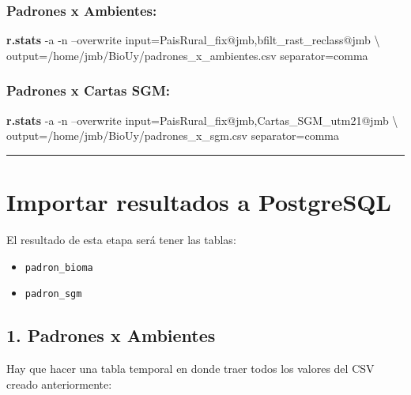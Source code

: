 \documentclass[spanish,]{article}
\newenvironment{Shaded}{}{}
\newcommand{\KeywordTok}[1]{\textcolor[rgb]{0.00,0.44,0.13}{\textbf{{#1}}}}
\newcommand{\NormalTok}[1]{{#1}}
\providecommand{\tightlist}{%
  \setlength{\itemsep}{0pt}\setlength{\parskip}{0pt}}
\begin{document}
\subsubsection{Padrones x Ambientes:}\label{padrones-x-ambientes}

\begin{Shaded}
\begin{Highlighting}[]
\KeywordTok{r.stats} \NormalTok{-a -n --overwrite input=PaisRural_fix@jmb,bfilt_rast_reclass@jmb \textbackslash{}}
  \NormalTok{output=/home/jmb/BioUy/padrones_x_ambientes.csv separator=comma}
\end{Highlighting}
\end{Shaded}

\subsubsection{Padrones x Cartas SGM:}\label{padrones-x-cartas-sgm}

\begin{Shaded}
\begin{Highlighting}[]
\KeywordTok{r.stats} \NormalTok{-a -n --overwrite input=PaisRural_fix@jmb,Cartas_SGM_utm21@jmb \textbackslash{}}
  \NormalTok{output=/home/jmb/BioUy/padrones_x_sgm.csv separator=comma}
\end{Highlighting}
\end{Shaded}

\begin{center}\rule{0.5\linewidth}{\linethickness}\end{center}

\section{Importar resultados a
PostgreSQL}\label{importar-resultados-a-postgresql}

El resultado de esta etapa será tener las tablas:

\begin{itemize}
\tightlist
\item
  \texttt{padron\_bioma}
\item
  \texttt{padron\_sgm}
\end{itemize}

\subsection{1. Padrones x Ambientes}\label{padrones-x-ambientes-1}

Hay que hacer una tabla temporal en donde traer todos los valores del
CSV creado anteriormente:
\end{document}
